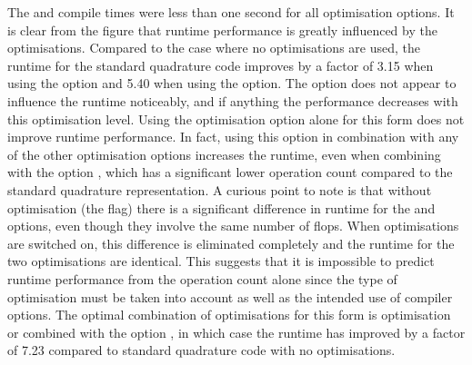 %
The \ffc{} and  compile times were less than one second for all
optimisation options.
It is clear from the figure that runtime performance is greatly influenced by
the  optimisations.
Compared to the case where no  optimisations are used, the runtime for
the standard quadrature code improves by a factor of 3.15 when using the
 option and 5.40 when using the  option.
The  option does not appear to influence the runtime noticeably,
and if anything the performance decreases with this optimisation level.
Using the \ffc{} optimisation option  alone for this
form does not improve runtime performance.
In fact, using this option in combination with any of the other
optimisation options increases
the runtime, even when combining with the option , which has a
significant lower operation count compared to the standard quadrature
representation.
A curious point to note is that without  optimisation (the  flag)
there is a significant
difference in runtime for the  and  options, even though they
involve the same number of flops.
When  optimisations are switched on, this difference is eliminated
completely and the runtime for the two \ffc{} optimisations are identical.
This suggests that it is impossible to predict runtime performance from the
operation count alone since the type of \ffc{} optimisation must be taken into
account as well as the intended use of  compiler options.
The optimal combination of optimisations for this form is \ffc{} optimisation
 or  combined with the  option , in which
case the runtime has improved by a factor of 7.23 compared to standard
quadrature code with no  optimisations.

